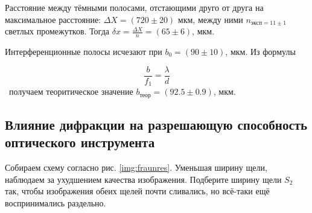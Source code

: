 \documentclass[a5paper,10pt, twoside]{article} %
\begin{document}
Расстояние между тёмными полосами, отстающими друго от друга на максимальное
расстояние: $\Delta X = (720 \pm 20)$ мкм, между ними $n_{\text{эксп} = 11 \pm 1}$ светлых
промежутков. Тогда $\delta x = \frac{\Delta X}{n} = (65 \pm 6)$, мкм.

Интерференционные полосы исчезают при $b_0 = (90 \pm 10)$, мкм. Из формулы

\begin{displaymath}
	\frac{b}{f_1} = \frac{\lambda}{d}
\end{displaymath}
\
получаем теоритическое значение $b_{\text{теор}} = (92.5 \pm 0.9)$, мкм.

\subsection{Влияние дифракции на разрешающую способность оптического инструмента}

Собираем схему согласно рис. \ref{img:fraunres}. Уменьшая ширину щели, наблюдаем за ухудшением 
качества изображения. Подберите ширину щели $S_2$ так, чтобы изображения обеих щелей почти сливались, 
но всё-таки ещё воспринимались раздельно.
\end{document}
